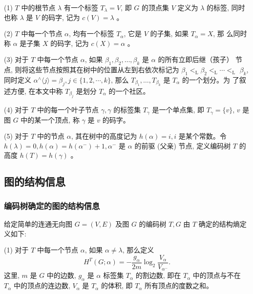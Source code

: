 \documentclass[a4paper]{apa6}
\begin{document}
(1) \(T\) 中的根节点 \(\lambda\) 有一个标签 \(T_{\lambda}=V\), 即 \(G\) 的顶点集 \(V\) 定义为 \(\lambda\) 的标签, 同时也称 \(\lambda\) 是 \(V\) 的码字, 记为 \(c(V)=\lambda\) 。

(2) \(T\) 中每一个节点 \(\alpha\), 均有一个标签 \(T_{\alpha}\), 它是 \(V\) 的子集, 如果 \(T_{\alpha}=X\), 那 么同时称 \(\alpha\) 是子集 \(X\) 的码字, 记为 \(c(X)=\alpha\) 。

(3) 对于 \(T\) 中每一个节点 \(\alpha\), 如果 \(\beta_{1}, \beta_{2}, \ldots, \beta_{k}\) 是 \(\alpha\) 的所有立即后继（孩子） 节点, 则将这些节点按照其在树中的位置从左到右依次标记为 \(\beta_{1}<_{\mathrm{L}} \beta_{2}<_{\mathrm{L}} \cdots<_{\mathrm{L}}\) \(\beta_{k}\), 同时定义 \(\alpha^{\wedge}\langle j\rangle=\beta_{j}, j \in\{1,2, \cdots, k\}\), 那么 \(T_{\beta_{1}}, \ldots, T_{\beta_{k}}\) 是 \(T_{\alpha}\) 的一个划分。为 了叙述方便, 在本文中称 \(T_{\beta_{j}}\) 是划分 \(T_{\alpha}\) 的一个社区。

(4) 对于 \(T\) 中的每一个叶子节点 \(\gamma, \gamma\) 的标签集 \(T_{\gamma}\) 是一个单点集, 即 \(T_{\gamma}=\{v\}\), \(v\) 是图 \(G\) 中的某一个顶点, 称 \(\gamma\) 是 \(v\) 的码字。

(5) 对于 \(T\) 中的节点 \(\alpha\), 其在树中的高度记为 \(h(\alpha)=i, i\) 是某个常数。令 \(h(\lambda)=0, h(\alpha)=h\left(\alpha^{-}\right)+1, \alpha^{-}\) 是 \(\alpha\) 的前驱 (父亲) 节点, 定义编码树 \(T\) 的高度 \(h(T)=h(\gamma)\) 。

\subsection{图的结构信息}
\label{sec:org8b3c71e}
\subsubsection{编码树确定的图的结构信息}
\label{sec:org4762edd}
给定简单的连通无向图 \(G=(V, E)\) 及图 \(G\) 的编码树 \(T, G\) 由 \(T\) 确定的结构熵定义如下:

(1) 对于 \(T\) 中每一个节点 \(\alpha\), 如果 \(\alpha \neq \lambda\), 那么定义
$$
H^{T}(G ; \alpha)=-\frac{g_{\alpha}}{2 m} \log _{2} \frac{V_{\alpha}}{V_{\alpha^{-}}} .
$$
这里, \(m\) 是 \(G\) 中的边数, \(g_{\alpha}\) 是 \(\alpha\) 标签集 \(T_{\alpha}\) 的割边数, 即在 \(T_{\alpha}\) 中的顶点与不在 \(T_{\alpha}\) 中的顶点的连边数, \(V_{\alpha}\) 是 \(T_{\alpha}\) 的体积, 即 \(T_{\alpha}\) 所有顶点的度数之和。
\end{document}
